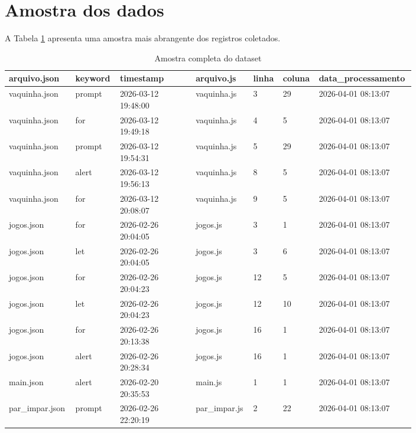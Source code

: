 \section*{Amostra dos dados}

A Tabela \ref{tab:amostra-completa} apresenta uma amostra mais abrangente dos registros coletados.

\begin{table}[H]
\centering
\caption{Amostra completa do dataset}
\label{tab:amostra-completa}
\scriptsize
\begin{tabular}{|p{0.14\linewidth}|p{0.10\linewidth}|p{0.18\linewidth}|p{0.12\linewidth}|p{0.06\linewidth}|p{0.06\linewidth}|p{0.14\linewidth}|}
\hline
\textbf{arquivo.json} & \textbf{keyword} & \textbf{timestamp} & \textbf{arquivo.js} & \textbf{linha} & \textbf{coluna} & \textbf{data\_processamento} \\
\hline
vaquinha.json & prompt & 2026-03-12 19:48:00 & vaquinha.js & 3 & 29 & 2026-04-01 08:13:07 \\
\hline
vaquinha.json & for & 2026-03-12 19:49:18 & vaquinha.js & 4 & 5 & 2026-04-01 08:13:07 \\
\hline
vaquinha.json & prompt & 2026-03-12 19:54:31 & vaquinha.js & 5 & 29 & 2026-04-01 08:13:07 \\
\hline
vaquinha.json & alert & 2026-03-12 19:56:13 & vaquinha.js & 8 & 5 & 2026-04-01 08:13:07 \\
\hline
vaquinha.json & for & 2026-03-12 20:08:07 & vaquinha.js & 9 & 5 & 2026-04-01 08:13:07 \\
\hline
jogos.json & for & 2026-02-26 20:04:05 & jogos.js & 3 & 1 & 2026-04-01 08:13:07 \\
\hline
jogos.json & let & 2026-02-26 20:04:05 & jogos.js & 3 & 6 & 2026-04-01 08:13:07 \\
\hline
jogos.json & for & 2026-02-26 20:04:23 & jogos.js & 12 & 5 & 2026-04-01 08:13:07 \\
\hline
jogos.json & let & 2026-02-26 20:04:23 & jogos.js & 12 & 10 & 2026-04-01 08:13:07 \\
\hline
jogos.json & for & 2026-02-26 20:13:38 & jogos.js & 16 & 1 & 2026-04-01 08:13:07 \\
\hline
jogos.json & alert & 2026-02-26 20:28:34 & jogos.js & 16 & 1 & 2026-04-01 08:13:07 \\
\hline
main.json & alert & 2026-02-20 20:35:53 & main.js & 1 & 1 & 2026-04-01 08:13:07 \\
\hline
par\_impar.json & prompt & 2026-02-26 22:20:19 & par\_impar.js & 2 & 22 & 2026-04-01 08:13:07 \\

\end{tabular}
\end{table}
